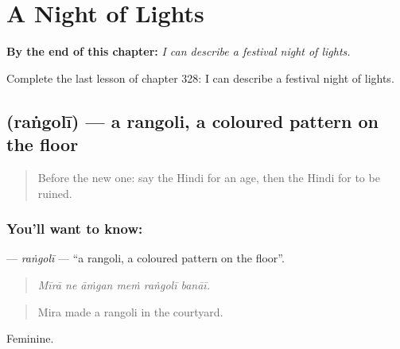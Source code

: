 
\chapter{A Night of Lights}
\label{ch:hi-a-night-of-lights}

\begin{chapteropening}
\textbf{By the end of this chapter:} \emph{I can describe a festival night of lights.}

Complete the last lesson of chapter 328: I can describe a festival night of lights.
\end{chapteropening}

\section[\texorpdfstring{\hi{रंगोली} (raṅgolī)}{रंगोली (raṅgolī)}]{ (raṅgolī) — a rangoli, a coloured pattern on the floor}

\label{lesson:HI-C328-rangoli}



\begin{quote}
Before the new one: say the Hindi for an age, then the Hindi for to be ruined.
\end{quote}

\subsection*{You'll want to know: }
\textbf{} — \emph{raṅgolī} — \textquotedblleft{}a rangoli, a coloured pattern on the floor\textquotedblright{}.

\begin{quote}
     
\end{quote}

\begin{quote}
\emph{Mīrā ne āṁgan meṁ raṅgolī banāī.}
\end{quote}

\begin{quote}
Mira made a rangoli in the courtyard.
\end{quote}

Feminine.

